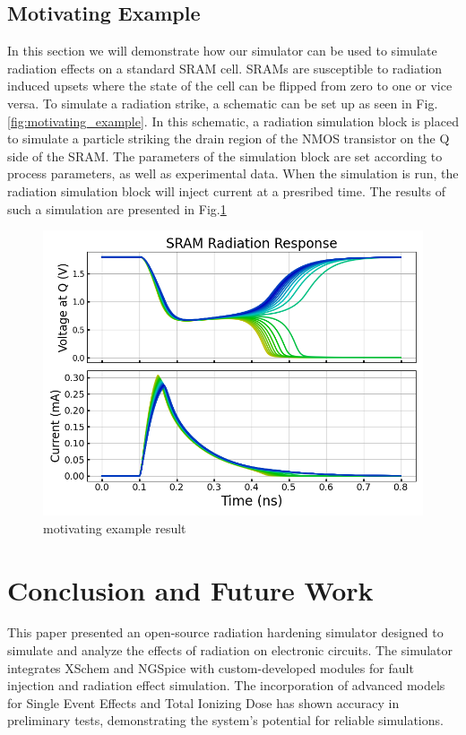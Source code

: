 \documentclass[conference]{IEEEtran}
\begin{document}
    \subsection{Motivating Example}\label{subsec:motivating-example}
    In this section we will demonstrate how our simulator can be used to simulate radiation effects on a standard SRAM cell. SRAMs are susceptible to radiation induced upsets where the state of the cell can be flipped from zero to one or vice versa. To simulate a radiation strike, a schematic can be set up as seen in Fig. \ref{fig:motivating_example}. In this schematic, a radiation simulation block is placed to simulate a particle striking the drain region of the NMOS transistor on the Q side of the SRAM. The parameters of the simulation block are set according to process parameters, as well as experimental data. When the simulation is run, the radiation simulation block will inject current at a presribed time. The results of such a simulation are presented in Fig.\ref{fig:motivating_example_result}
    
    
    
    \begin{figure}[htbp]
        \centering
        \includegraphics[width=0.95\linewidth]{SRAM_Response_Multi}
        \caption{motivating example result}
        \label{fig:motivating_example_result}
    \end{figure}

    \section{Conclusion and Future Work}\label{sec:conclusion-and-future-work}
    This paper presented an open-source radiation hardening simulator designed to simulate and analyze the effects of radiation on electronic circuits.
    The simulator integrates XSchem and NGSpice with custom-developed modules for fault injection and radiation effect simulation.
    The incorporation of advanced models for Single Event Effects and Total Ionizing Dose has shown accuracy in preliminary tests, demonstrating the system's potential for reliable simulations.
\end{document}

